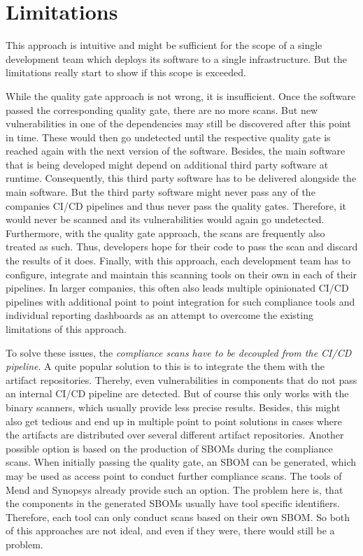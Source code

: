 \section{Limitations}
This approach is intuitive and might be sufficient for the scope of a single development team which deploys its software to a single infrastructure. But the limitations really start to show if this scope is exceeded.\par
While the quality gate approach is not wrong, it is insufficient. Once the software passed the corresponding quality gate, there are no more scans. But new vulnerabilities in one of the dependencies may still be discovered after this point in time. These would then go undetected until the respective quality gate is reached again with the next version of the software. Besides, the main software that is being developed might depend on additional third party software at runtime. Consequently, this third party software has to be delivered alongside the main software. But the third party software might never pass any of the companies CI/CD pipelines and thus never pass the quality gates. Therefore, it would never be scanned and its vulnerabilities would again go undetected. Furthermore, with the quality gate approach, the scans are frequently also treated as such. Thus, developers hope for their code to pass the scan and discard the results of it does. Finally, with this approach, each development team has to configure, integrate and maintain this scanning tools on their own in each of their pipelines. In larger companies, this often also leads multiple opinionated CI/CD pipelines with additional point to point integration for such compliance tools and individual reporting dashboards as an attempt to overcome the existing limitations of this approach.\par
To solve these issues, the \textit{compliance scans have to be decoupled from the CI/CD pipeline}. A quite popular solution to this is to integrate the them with the artifact repositories. Thereby, even vulnerabilities in components that do not pass an internal CI/CD pipeline are detected. But of course this only works with the binary scanners, which usually provide less precise results. Besides, this might also get tedious and end up in multiple point to point solutions in cases where the artifacts are distributed over several different artifact repositories. Another possible option is based on the production of SBOMs during the compliance scans. When initially passing the quality gate, an SBOM can be generated, which may be used as access point to conduct further compliance scans. The tools of Mend and Synopsys already provide such an option. The problem here is, that the components in the generated SBOMs usually have tool specific identifiers. Therefore, each tool can only conduct scans based on their own SBOM. So both of this approaches are not ideal, and even if they were, there would still be a problem.\par
